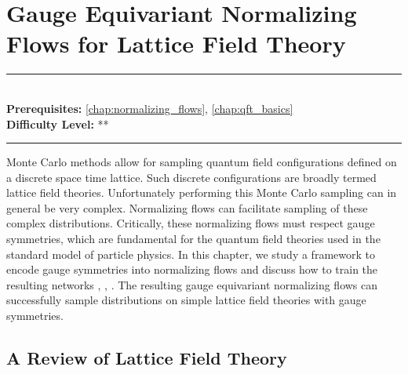\documentclass[book.tex]{subfiles}
\begin{document}
\chapter{Gauge Equivariant Normalizing Flows for Lattice Field Theory}

\label{chap:gauge_equivariant_flow}
\noindent\rule{11cm}{0.4pt} \\
\textbf{Prerequisites:} \autoref{chap:normalizing_flows}, \autoref{chap:qft_basics} \\
\textbf{Difficulty Level:} ** \\
\noindent\rule{11cm}{0.4pt}
\vspace{5mm}


Monte Carlo methods allow for sampling quantum field configurations defined on a discrete space time lattice. Such discrete configurations are broadly termed lattice field theories. Unfortunately performing this Monte Carlo sampling can in general be very complex. Normalizing flows can facilitate sampling of these complex distributions. Critically, these normalizing flows must respect gauge symmetries, which are fundamental for the quantum field theories used in the standard model of particle physics. In this chapter, we study a framework to encode gauge symmetries into normalizing flows and discuss how to train the resulting networks \cite{kanwar2020equivariant}, \cite{albergo2019flow}, \cite{boyda2021sampling}. The resulting gauge equivariant normalizing flows can successfully sample distributions on simple lattice field theories with gauge symmetries.

\section{A Review of Lattice Field Theory}
\end{document}
